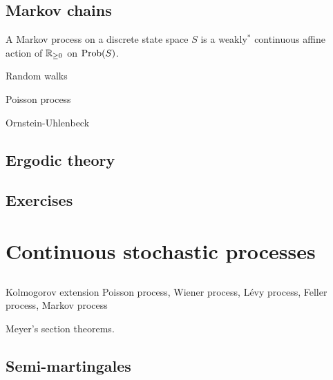 \documentclass{../../large}
\begin{document}
\section{Markov chains}

A Markov process on a discrete state space $S$ is a weakly$^*$ continuous affine action of $\mathbb{R}_{\ge0}$ on $\operatorname{Prob}(S)$.

Random walks

Poisson process

Ornstein-Uhlenbeck

\section{Ergodic theory}



\section*{Exercises}



\chapter{Continuous stochastic processes}

\section{}
Kolmogorov extension
Poisson process, Wiener process, L\'evy process, Feller process, Markov process

Meyer's section theorems.


\section{Semi-martingales}
\end{document}
